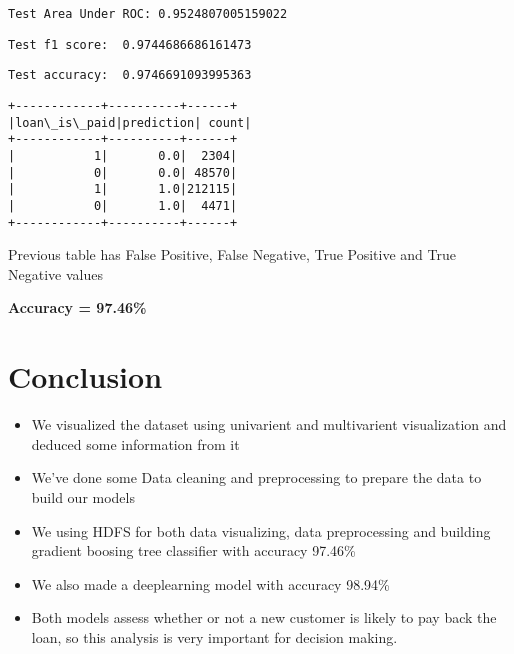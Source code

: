 \documentclass[11pt]{article}
\providecommand{\tightlist}{%
      \setlength{\itemsep}{0pt}\setlength{\parskip}{0pt}}
\begin{document}
    \begin{Verbatim}[commandchars=\\\{\}]
Test Area Under ROC: 0.9524807005159022
    \end{Verbatim}

    \begin{Verbatim}[commandchars=\\\{\}]
Test f1 score:  0.9744686686161473
    \end{Verbatim}

    \begin{Verbatim}[commandchars=\\\{\}]
Test accuracy:  0.9746691093995363
    \end{Verbatim}

    \begin{Verbatim}[commandchars=\\\{\}]
+------------+----------+------+
|loan\_is\_paid|prediction| count|
+------------+----------+------+
|           1|       0.0|  2304|
|           0|       0.0| 48570|
|           1|       1.0|212115|
|           0|       1.0|  4471|
+------------+----------+------+

    \end{Verbatim}

    Previous table has False Positive, False Negative, True Positive and
True Negative values

    \textbf{Accuracy = 97.46\%}

    \section{Conclusion}

    \begin{itemize}
\tightlist
\item
  We visualized the dataset using univarient and multivarient
  visualization and deduced some information from it
\item
  We've done some Data cleaning and preprocessing to prepare the data to
  build our models
\item
  We using HDFS for both data visualizing, data preprocessing and
  building gradient boosing tree classifier with accuracy 97.46\%
\item
  We also made a deeplearning model with accuracy 98.94\%
\item
  Both models assess whether or not a new customer is likely to pay back
  the loan, so this analysis is very important for decision making.
\end{itemize}


    
    
    
\end{document}
